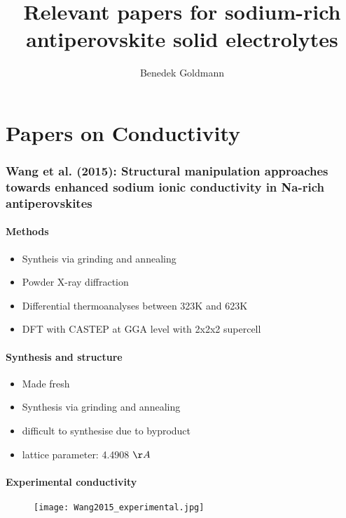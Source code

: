 \documentclass[10pt,a4paper, titlepage]{article}
\title{Relevant papers for sodium-rich antiperovskite solid electrolytes}
\author{Benedek Goldmann}
\begin{document}
\maketitle
\tableofcontents
\clearpage

\part{Papers on Conductivity}

\section{Wang et al. (2015): Structural manipulation approaches towards enhanced sodium ionic conductivity in Na-rich antiperovskites}

\subsection{Methods}

\begin{itemize}
  \item Syntheis via grinding and annealing
  \item Powder X-ray diffraction
  \item Differential thermoanalyses between 323K and 623K
  \item DFT with CASTEP at GGA level with 2x2x2 supercell
\end{itemize}

\subsection{Synthesis and structure}

\begin{itemize}
  \item Made  fresh
  \item Synthesis via grinding and annealing
  \item {} difficult to synthesise due to  byproduct
  \item {} lattice parameter: 4.4908 $\AA$
\end{itemize}

\subsection{Experimental conductivity}

\begin{figure}[H]
\centering
\texttt{[image: Wang2015\_experimental.jpg]}
\end{figure}
\end{document}
